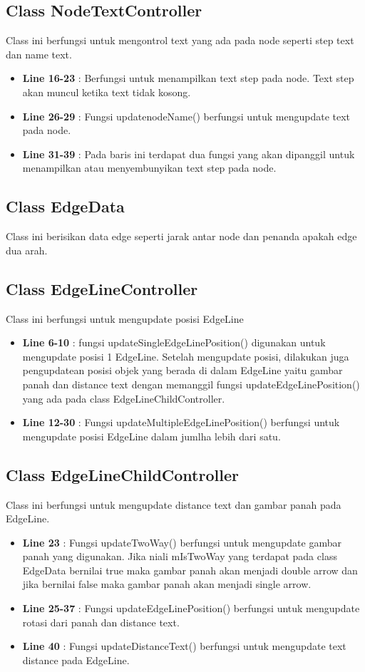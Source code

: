 \documentclass[12pt,a4paper,oneside]{article}
\begin{document}
\subsection{Class NodeTextController}
Class ini berfungsi untuk mengontrol text yang ada pada node seperti step text dan name text.
\begin{itemize}
	\item \textbf{Line 16-23} : Berfungsi untuk menampilkan text step pada node. Text step akan muncul ketika text tidak kosong.
	\item \textbf{Line 26-29} : Fungsi updatenodeName() berfungsi untuk mengupdate text pada node.
	\item \textbf{Line 31-39} : Pada baris ini terdapat dua fungsi yang akan dipanggil untuk menampilkan atau menyembunyikan text step pada node. 
\end{itemize}
\subsection{Class EdgeData}
Class ini berisikan data edge seperti jarak antar node dan penanda apakah edge dua arah.
\subsection{Class EdgeLineController}
Class ini berfungsi untuk mengupdate posisi EdgeLine
\begin{itemize}
	\item \textbf{Line 6-10} : fungsi updateSingleEdgeLinePosition() digunakan untuk mengupdate posisi 1 EdgeLine. Setelah mengupdate posisi, dilakukan juga pengupdatean posisi objek yang berada di dalam EdgeLine yaitu gambar panah dan distance text dengan memanggil fungsi updateEdgeLinePosition() yang ada pada class EdgeLineChildController.
	\item \textbf{Line 12-30} : Fungsi updateMultipleEdgeLinePosition() berfungsi untuk mengupdate posisi EdgeLine dalam jumlha lebih dari satu. 
\end{itemize}
\subsection{Class EdgeLineChildController}
Class ini berfungsi untuk mengupdate distance text dan gambar panah pada EdgeLine.
\begin{itemize}
	\item \textbf{Line 23} : Fungsi updateTwoWay() berfungsi untuk mengupdate gambar panah yang digunakan. Jika niali mIsTwoWay yang terdapat pada class EdgeData bernilai true maka gambar panah akan menjadi double arrow dan jika bernilai false maka gambar panah akan menjadi single arrow.
	\item \textbf{Line 25-37} : Fungsi updateEdgeLinePosition() berfungsi untuk mengupdate rotasi dari panah dan distance text.
	\item \textbf{Line 40} : Fungsi updateDistanceText() berfungsi untuk mengupdate text distance pada EdgeLine.  
\end{itemize}
\end{document}
